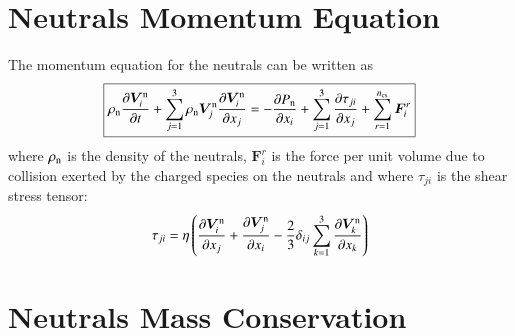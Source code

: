 \documentclass{warpdoc}
\newcommand\frameeqn[1]{\fbox{$\displaystyle #1$}}
\newcommand{\ncs}{{n_{\rm cs}}}
\newcommand{\visc}{\eta}
\renewcommand{\vec}[1]{\bm{#1}}
\begin{document}
%






\section{Neutrals Momentum Equation}

The momentum equation for the neutrals can be written as
%
\begin{equation}
\frameeqn{
  \rho_{\rm n} \frac{\partial \vec{V}_i^{\rm n} }{\partial t}+ \sum_{j=1}^3 \rho_{\rm n} \vec{V}_j^{\rm n} \frac{\partial \vec{V}_i^{\rm n}}{\partial x_j}
=
-\frac{\partial P_{\rm n}}{\partial x_i} 
+ \sum_{j=1}^3 \frac{\partial \tau_{ji}}{\partial x_j}
+ \sum_{r=1}^\ncs \vec{F}_i^r
}
\label{eqn:momentumneutral}
\end{equation}
%
where $\rho_{\rm n}$ is the density of the neutrals, $\vec{F}_i^r$  is the force per unit volume due to collision exerted by the charged species on the neutrals and where $\tau_{ji}$ is the shear stress tensor:
%
\begin{equation}
\tau_{ji} = \visc  \left( \frac{\partial \vec{V}^{\rm n}_i}{\partial x_j} + \frac{\partial \vec{V}^{\rm n}_j}{\partial x_i} - \frac{2}{3} \delta_{ij} \sum_{k=1}^3 \frac{\partial \vec{V}^{\rm n}_k}{\partial x_k} \right)
\label{eqn:shearstress}
\end{equation}
%






\section{Neutrals Mass Conservation}
\end{document}
